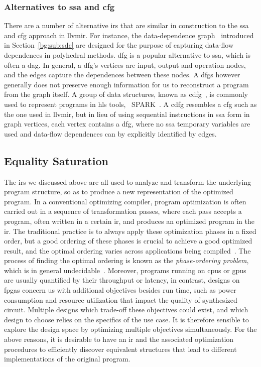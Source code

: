 \subsubsection{Alternatives to \gls{ssa} and \gls{cfg}}

There are a number of alternative \glspl{ir} that are similar in construction
to the \gls{ssa} and \gls{cfg} approach in \gls{llvmir}\@.  For instance, the
data-dependence graph~\cite{rau94} introduced in Section~\ref{bg:sub:sdc} are
designed for the purpose of capturing data-flow dependences in polyhedral
methods.  \Gls{dfg} is a popular alternative to \gls{ssa}, which is often
a \gls{dag}.  In general, a \gls{dfg}'s vertices are input, output and
operation nodes, and the edges capture the dependences between these nodes.
A \glspl{dfg} however generally does not preserve enough information for us
to reconstruct a program from the graph itself.  A group of data structures,
known as \gls{cdfg}~\cite{orailoglu86}, is commonly used to represent programs
in \gls{hls} tools, \eg~SPARK~\cite{gupta04}.  A \gls{cdfg} resembles a
\gls{cfg} such as the one used in \gls{llvmir}, but in lieu of using sequential
instructions in \gls{ssa} form in graph vertices, each vertex contains a
\gls{dfg}, where no \gls{ssa} temporary variables are used and data-flow
dependences can by explicitly identified by edges.


\subsection{Equality Saturation}
\label{bg:sub:equality_saturation}

The \glspl{ir} we discussed above are all used to analyze and transform the
underlying program structure, so as to produce a new representation of the
optimized program.  In a conventional optimizing compiler, program optimization
is often carried out in a sequence of transformation passes, where each pass
accepts a program, often written in a certain \gls{ir}, and produces an
optimized program in the \gls{ir}\@.  The traditional practice is to always
apply these optimization phases in a fixed order, but a good ordering of these
phases is crucial to achieve a good optimized result, and the optimal ordering
varies across applications being compiled~\cite{almagor04}.  The process of
finding the optimal ordering is known as the \emph{phase-ordering problem},
which is in general undecidable~\cite{touati06}.  Moreover, programs running
on \glspl{cpu} or \glspl{gpu} are usually quantified by their throughput or
latency, in contrast, designs on \glspl{fpga} concern us with additional
objectives besides run time, such as power consumption and resource utilization
that impact the quality of synthesized circuit.  Multiple designs which
trade-off these objectives could exist, and which design to choose relies
on the specifics of the use case.  It is therefore sensible to explore the
design space by optimizing multiple objectives simultaneously.  For the above
reasons, it is desirable to have an \gls{ir} and the associated optimization
procedures to efficiently discover equivalent structures that lead to different
implementations of the original program.

